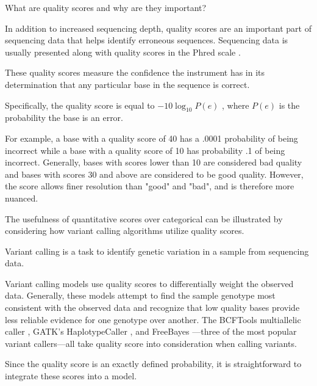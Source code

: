 \documentclass{article}
\begin{document}
\begin{outline}
	\item What are quality scores and why are they important? \parencite{ewing_base-calling_1998} \parencite{ewing_base-calling_1998-1}
	\begin{outline}
		\item In addition to increased sequencing depth, quality scores are an important part of sequencing data that helps identify erroneous sequences. Sequencing data is usually presented along with quality scores in the Phred scale \parencite{ewing_base-calling_1998, ewing_base-calling_1998-1}.
		\item These quality scores measure the confidence the instrument has in its determination that any particular base in the sequence is correct.
		\item Specifically, the quality score is equal to $-10\log_{10}P(e)$ \parencite{ewing_base-calling_1998} \parencite{ewing_base-calling_1998-1}, where $P(e)$ is the probability the base is an error.
		\item For example, a base with a quality score of 40 has a .0001 probability of being incorrect while a base with a quality score of 10 has probability .1 of being incorrect. Generally, bases with scores lower than 10 are considered bad quality and bases with scores 30 and above are considered to be good quality. However, the score allows finer resolution than "good" and "bad", and is therefore more nuanced.
		\item The usefulness of quantitative scores over categorical can be illustrated by considering how variant calling algorithms utilize quality scores.
		\item Variant calling is a task to identify genetic variation in a sample from sequencing data.
		\item Variant calling models use quality scores to differentially weight the observed data. Generally, these models attempt to find the sample genotype most consistent with the observed data and recognize that low quality bases provide less reliable evidence for one genotype over another. The BCFTools multiallelic caller \parencite{li_sequence_2009}, GATK's HaplotypeCaller \parencite{poplin_scaling_2018}, and FreeBayes \parencite{garrison_haplotype-based_2012}---three of the most popular variant callers---all take quality score into consideration when calling variants.
		\item Since the quality score is an exactly defined probability, it is straightforward to integrate these scores into a model.

\end{outline}
\end{outline}
\end{document}
